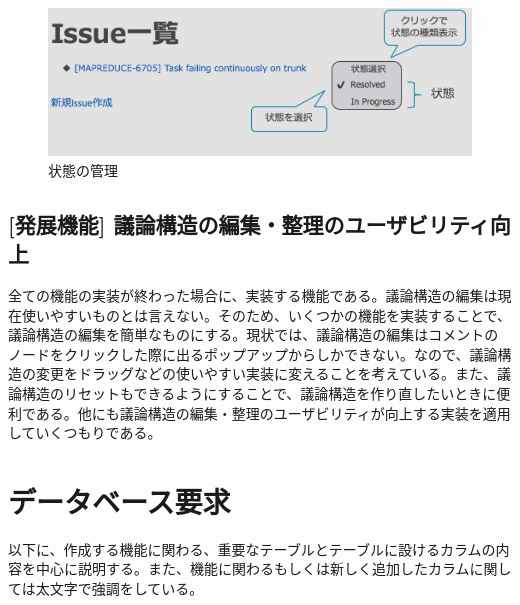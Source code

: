 \documentclass[12pt, oneside]{jreport}
\begin{document}
		\begin{figure}[H]
		\centering
		\includegraphics[width=17cm,bb=500 300 -200 27]{IssueState.png}
		\caption{状態の管理}
		\end{figure}

		\subsection{[発展機能] 議論構造の編集・整理のユーザビリティ向上}
		全ての機能の実装が終わった場合に、実装する機能である。議論構造の編集は現在使いやすいものとは言えない。そのため、いくつかの機能を実装することで、議論構造の編集を簡単なものにする。現状では、議論構造の編集はコメントのノードをクリックした際に出るポップアップからしかできない。なので、議論構造の変更をドラッグなどの使いやすい実装に変えることを考えている。また、議論構造のリセットもできるようにすることで、議論構造を作り直したいときに便利である。他にも議論構造の編集・整理のユーザビリティが向上する実装を適用していくつもりである。

	\section{データベース要求}
	
	以下に、作成する機能に関わる、重要なテーブルとテーブルに設けるカラムの内容を中心に説明する。また、機能に関わるもしくは新しく追加したカラムに関しては太文字で強調をしている。
	
\end{document}
